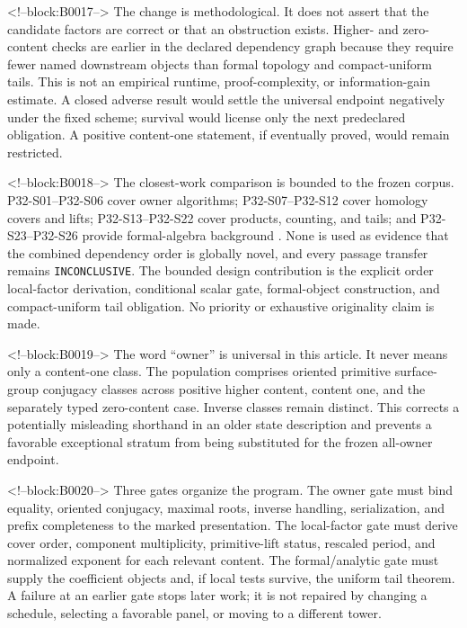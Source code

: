 \documentclass[11pt]{article}
\begin{document}
<!--block:B0017-->
The change is methodological. It does not assert that the candidate factors
are correct or that an obstruction exists. Higher- and zero-content checks are
earlier in the declared dependency graph because they require fewer named
downstream objects than formal topology and compact-uniform tails. This is not
an empirical runtime, proof-complexity, or information-gain estimate. A closed
adverse result would settle the universal endpoint negatively under the fixed
scheme; survival would license only the next predeclared obligation. A positive
content-one statement, if eventually proved, would remain restricted.

<!--block:B0018-->
The closest-work comparison is bounded to the frozen corpus. P32-S01--P32-S06
cover owner algorithms; P32-S07--P32-S12 cover homology covers and lifts;
P32-S13--P32-S22 cover products, counting, and tails; and P32-S23--P32-S26
provide formal-algebra background
\citep{P32-S01,P32-S02,P32-S03,P32-S04,P32-S05,P32-S06,P32-S07,P32-S08,P32-S09,P32-S10,P32-S11,P32-S12,P32-S13,P32-S14,P32-S15,P32-S16,P32-S17,P32-S18,P32-S19,P32-S20,P32-S21,P32-S22,P32-S23,P32-S24,P32-S25,P32-S26}.
None is used as evidence that the combined dependency order is globally novel,
and every passage transfer remains \texttt{INCONCLUSIVE}. The bounded
design contribution is the explicit order local-factor derivation, conditional
scalar gate, formal-object construction, and compact-uniform tail obligation.
No priority or exhaustive originality claim is made.

<!--block:B0019-->
The word ``owner'' is universal in this article. It never means only a
content-one class. The population comprises oriented primitive
surface-group conjugacy classes across positive higher content, content
one, and the separately typed zero-content case. Inverse classes remain
distinct. This corrects a potentially misleading shorthand in an older
state description and prevents a favorable exceptional stratum from
being substituted for the frozen all-owner endpoint.

<!--block:B0020-->
Three gates organize the program. The owner gate must bind equality,
oriented conjugacy, maximal roots, inverse handling, serialization, and
prefix completeness to the marked presentation. The local-factor gate
must derive cover order, component multiplicity, primitive-lift status,
rescaled period, and normalized exponent for each relevant content. The
formal/analytic gate must supply the coefficient objects and, if local
tests survive, the uniform tail theorem. A failure at an earlier gate
stops later work; it is not repaired by changing a schedule, selecting a
favorable panel, or moving to a different tower.
\end{document}
